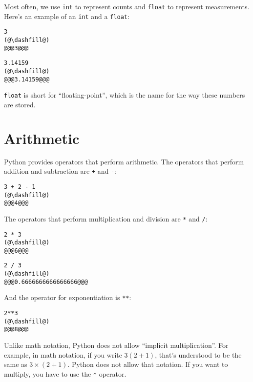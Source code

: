 Most often, we use \passthrough{\lstinline!int!} to represent counts and
\passthrough{\lstinline!float!} to represent measurements. Here's an
example of an \passthrough{\lstinline!int!} and a
\passthrough{\lstinline!float!}:

\begin{lstlisting}[]
3
(@\dashfill@)
@@@3@@@
\end{lstlisting}

\begin{lstlisting}[]
3.14159
(@\dashfill@)
@@@3.14159@@@
\end{lstlisting}

\passthrough{\lstinline!float!} is short for ``floating-point'', which
is the name for the way these numbers are stored.

\hypertarget{arithmetic}{%
\section{Arithmetic}\label{arithmetic}}

Python provides operators that perform arithmetic. The operators that
perform addition and subtraction are \passthrough{\lstinline!+!} and
\passthrough{\lstinline!-!}:

\begin{lstlisting}[]
3 + 2 - 1
(@\dashfill@)
@@@4@@@
\end{lstlisting}

The operators that perform multiplication and division are
\passthrough{\lstinline!*!} and \passthrough{\lstinline!/!}:

\begin{lstlisting}[]
2 * 3
(@\dashfill@)
@@@6@@@
\end{lstlisting}

\begin{lstlisting}[]
2 / 3
(@\dashfill@)
@@@0.6666666666666666@@@
\end{lstlisting}

And the operator for exponentiation is \passthrough{\lstinline!**!}:

\begin{lstlisting}[]
2**3
(@\dashfill@)
@@@8@@@
\end{lstlisting}

Unlike math notation, Python does not allow ``implicit multiplication''.
For example, in math notation, if you write \(3 (2 + 1)\), that's
understood to be the same as \(3 \times (2+ 1)\). Python does not allow
that notation. If you want to multiply, you have to use the
\passthrough{\lstinline!*!} operator.

